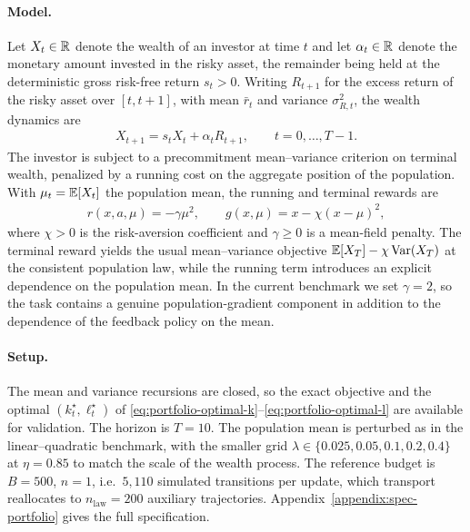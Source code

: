 \paragraph{Model.}
Let $X_t\in\mathbb{R}$ denote the wealth of an investor at time $t$ and let $\alpha_t\in\mathbb{R}$ denote the monetary amount invested in the risky asset, the remainder being held at the deterministic gross risk-free return $s_t>0$. Writing $R_{t+1}$ for the excess return of the risky asset over $[t,t+1]$, with mean $\bar r_t$ and variance $\sigma_{R,t}^2$, the wealth dynamics are
\begin{align}
    X_{t+1}=s_tX_t+\alpha_tR_{t+1},
    \qquad
    t=0,\ldots,T-1.
    \label{eq:portfolio-wealth-dynamics}
\end{align}
The investor is subject to a precommitment mean--variance criterion on terminal wealth, penalized by a running cost on the aggregate position of the population. With $\mu_t=\mathbb{E}[X_t]$ the population mean, the running and terminal rewards are
\begin{align}
    r(x,a,\mu)=-\gamma\mu^2,
    \qquad
    g(x,\mu)=x-\chi(x-\mu)^2,
    \label{eq:portfolio-rewards}
\end{align}
where $\chi>0$ is the risk-aversion coefficient and $\gamma\geq0$ is a mean-field penalty. The terminal reward yields the usual mean--variance objective $\mathbb{E}[X_T]-\chi\operatorname{Var}(X_T)$ at the consistent population law, while the running term introduces an explicit dependence on the population mean. In the current benchmark we set $\gamma=2$, so the task contains a genuine population-gradient component in addition to the dependence of the feedback policy on the mean.

\paragraph{Setup.}
The mean and variance recursions are closed, so the exact objective and the optimal $(k_t^\star,\ell_t^\star)$ of \eqref{eq:portfolio-optimal-k}--\eqref{eq:portfolio-optimal-l} are available for validation. The horizon is $T=10$. The population mean is perturbed as in the linear--quadratic benchmark, with the smaller grid $\lambda\in\{0.025,0.05,0.1,0.2,0.4\}$ at $\eta=0.85$ to match the scale of the wealth process. The reference budget is $B=500$, $n=1$, i.e.\ $5{,}110$ simulated transitions per update, which transport reallocates to $n_{\mathrm{law}}=200$ auxiliary trajectories. Appendix~\ref{appendix:spec-portfolio} gives the full specification.

